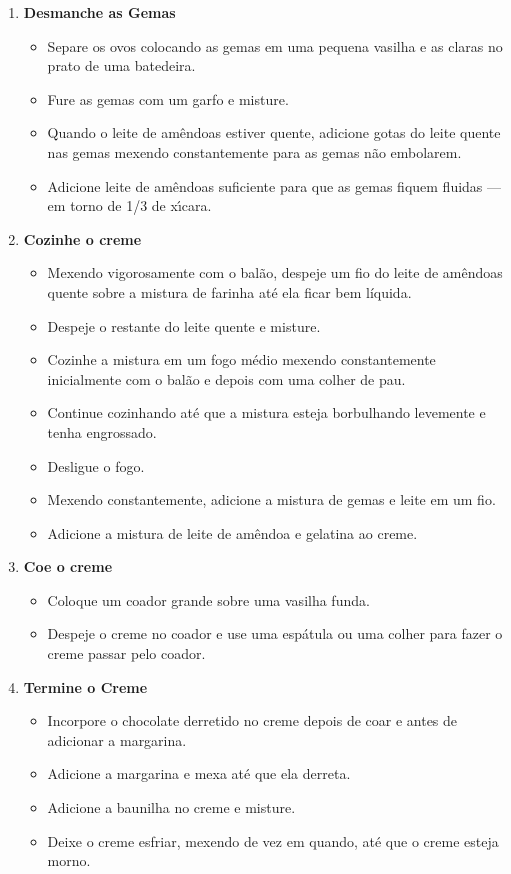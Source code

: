 \documentclass [11pt, letterpaper] {article}
\begin{document}
\begin{description}
\begin{enumerate}
	\item {\bf Desmanche as Gemas}
		\begin{itemize}
		\item Separe os ovos colocando as gemas em uma pequena vasilha e as claras no prato de uma batedeira. 
		\item Fure as gemas com um garfo e misture. 
		\item Quando o leite de am\^endoas estiver quente, adicione gotas do leite quente nas gemas mexendo constantemente para as gemas n\~ao embolarem. 
		\item Adicione leite de am\^endoas suficiente para que as gemas fiquem fluidas --- em torno de 1/3 de x\'{\i}cara.
		\end{itemize}

	\item {\bf Cozinhe o creme}
		\begin{itemize}
		\item Mexendo vigorosamente com o bal\~ao, despeje um fio do leite de am\^endoas quente sobre a mistura de farinha at\'e ela ficar bem l\'iquida.
		\item Despeje o  restante do leite quente e misture.  
		\item Cozinhe a mistura em um fogo m\'edio mexendo constantemente inicialmente com o bal\~ao e depois com uma colher de pau. 
		\item Continue cozinhando at\'e que a mistura esteja borbulhando levemente e tenha engrossado. 
		\item Desligue o fogo. 
		\item Mexendo constantemente, adicione a mistura de gemas e leite em um fio. 
		\item Adicione a mistura de leite de am\^endoa  e  gelatina ao creme. 
		\end{itemize}
	
	\item {\bf Coe o creme}
		\begin{itemize}
		\item Coloque um coador grande sobre uma vasilha funda. 
		\item Despeje o creme no coador e use uma esp\'atula ou uma colher para fazer o creme passar pelo coador.
		\end{itemize}
	
	\item {\bf Termine o Creme}
		\begin{itemize}
		\item Incorpore o chocolate derretido no creme depois de coar e antes de adicionar a margarina.
		\item Adicione a margarina e mexa at\'e que ela derreta. 
		\item Adicione a baunilha no creme e misture. 
		\item Deixe o creme esfriar, mexendo de vez em quando, at\'e que o creme esteja morno.
		\end{itemize}


\end{enumerate}
\end{description}
\end{document}

